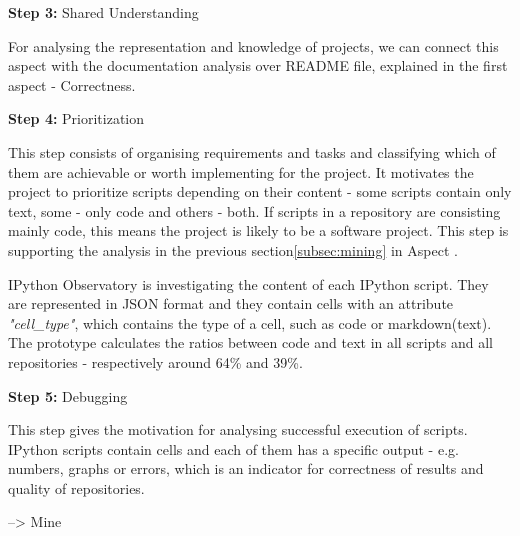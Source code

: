 \vspace{5mm}
\begin{mdframed}
\vspace{1px}
\textbf{Step 3:} Shared Understanding
\vspace{1px}
\end{mdframed}
\vspace{2mm}

For analysing the representation and knowledge of projects, we can connect this aspect with the documentation analysis over README file, explained in the first aspect - Correctness.


\vspace{5mm}
\begin{mdframed}
\vspace{1px}
\textbf{Step 4:} Prioritization
\vspace{1px}
\end{mdframed}
\vspace{2mm}

This step consists of organising requirements and tasks and classifying which of them are achievable or worth
implementing for the project. It motivates the project to prioritize scripts depending on their content - some scripts contain only text, some - only code and others - both. If scripts in a repository are consisting mainly code, this means the project is likely to be a software project. This step is supporting the analysis in the previous section\ref{subsec:mining} in Aspect . 

IPython Observatory is investigating the content of each IPython script. They are represented in JSON format\cite{json} and they contain cells with an attribute \textit{"cell\_type"}, which contains the type of a cell, such as code or markdown(text). The prototype calculates the ratios between code and text in all scripts and all repositories - respectively around 64\% and 39\%. 

\vspace{5mm}
\begin{mdframed}
\vspace{1px}
\textbf{Step 5:} Debugging
\vspace{1px}
\end{mdframed}

This step gives the motivation for analysing successful execution of scripts. IPython scripts contain cells and each of them has a specific output - e.g. numbers, graphs or errors, which is an indicator for correctness of results and quality of repositories. 

--> Mine

\vspace{5mm}
